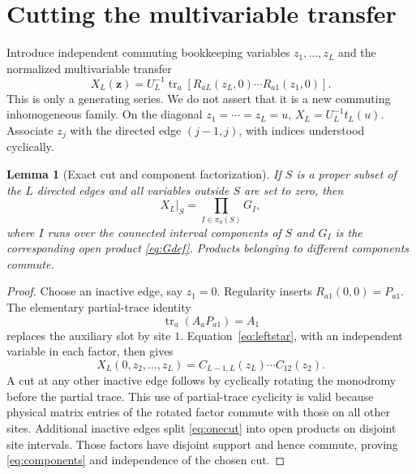 \documentclass[11pt,a4paper]{article}
\newtheorem{lemma}[theorem]{Lemma}
\theoremstyle{definition}
\theoremstyle{remark}
\newcommand{\tr}{\operatorname{tr}}
\begin{document}
\section{Cutting the multivariable transfer}

Introduce independent commuting bookkeeping variables $z_1,\ldots,z_L$ and the
normalized multivariable transfer
\begin{equation}
 X_L(\bm z)=U_L^{-1}\tr_a\!\left[
 R_{aL}(z_L,0)\cdots R_{a1}(z_1,0)\right].
 \label{eq:multix}
\end{equation}
This is only a generating series.  We do not assert that it is a new commuting
inhomogeneous family.  On the diagonal $z_1=\cdots=z_L=u$,
$X_L=U_L^{-1}t_L(u)$.  Associate $z_j$ with the directed edge $(j-1,j)$, with
indices understood cyclically.

\begin{lemma}[Exact cut and component factorization]
\label{lem:cut}
If $S$ is a proper subset of the $L$ directed edges and all variables outside $S$
are set to zero, then
\begin{equation}
 X_L\big|_S=\prod_{I\in\pi_0(S)}G_I,
 \label{eq:components}
\end{equation}
where $I$ runs over the connected interval components of $S$ and $G_I$ is the
corresponding open product \eqref{eq:Gdef}.  Products belonging to different
components commute.
\end{lemma}

\begin{proof}
Choose an inactive edge, say $z_1=0$.  Regularity inserts $R_{a1}(0,0)=P_{a1}$.
The elementary partial-trace identity
\begin{equation}
 \tr_a(A_aP_{a1})=A_1
\end{equation}
replaces the auxiliary slot by site $1$.  Equation~\eqref{eq:leftstar}, with an
independent variable in each factor, then gives
\begin{equation}
 X_L(0,z_2,\ldots,z_L)
 =C_{L-1,L}(z_L)\cdots C_{12}(z_2).
 \label{eq:onecut}
\end{equation}
A cut at any other inactive edge follows by cyclically rotating the monodromy before
the partial trace.  This use of partial-trace cyclicity is valid because physical
matrix entries of the rotated factor commute with those on all other sites.  Additional
inactive edges split \eqref{eq:onecut} into open products on disjoint site intervals.
Those factors have disjoint support and hence commute, proving
\eqref{eq:components} and independence of the chosen cut.
\end{proof}
\end{document}

